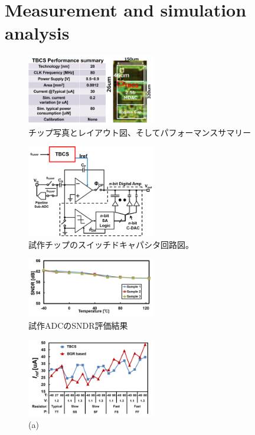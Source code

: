 \documentclass[letterpaper, 10 pt, conference]{ieeeconf}  %
\begin{document}
\section{Measurement and simulation analysis}
\begin{figure}[!]
\centering
 \includegraphics[width=0.5\textwidth]{figs/chip.png}
  \caption{チップ写真とレイアウト図、そしてパフォーマンスサマリー}
\label{chip}
\end{figure}

\begin{figure}[!]
\centering
 \includegraphics[width=0.5\textwidth]{figs/switchcap.png}
  \caption{試作チップのスイッチドキャパシタ回路図。}
\label{scap}
\end{figure}

\begin{figure}[!]
\centering
 \includegraphics[width=0.5\textwidth]{figs/sndr.png}
  \caption{試作ADCのSNDR評価結果}
\label{sndr}
\end{figure}

\begin{figure}[!]
\centering
 \includegraphics[width=0.5\textwidth]{figs/pvt.png}
  \caption{(a) 
}
\label{iref_pvt_both}
\end{figure}
\end{document}
